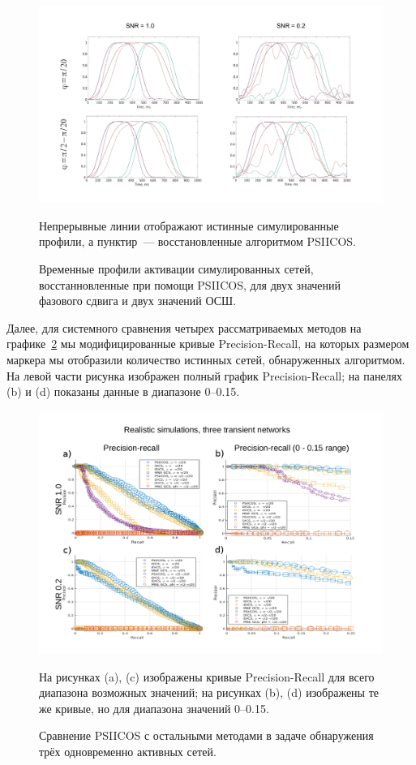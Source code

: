 \begin{figure}[!ht]
    \includegraphics[width=1\textwidth]{../images/psiicos_paper/Figure6_hr.jpg}
    \caption{Временные профили активации симулированных сетей, восстанновленные при помощи PSIICOS, для двух
        значений фазового сдвига и двух значений ОСШ.}\label{fig:06} %
        Непрерывные линии отображают истинные симулированные профили, а
        пунктир~--- восстановленные алгоритмом PSIICOS.\@
\end{figure}%

Далее, для системного сравнения четырех рассматриваемых методов на графике~\ref{fig:07}
мы модифицированные кривые Precision-Recall, на которых размером маркера мы отобразили
количество истинных сетей, обнаруженных алгоритмом. На левой части рисунка изображен
полный график Precision-Recall; на панелях (b) и (d) показаны данные в диапазоне 0--0.15.

\begin{figure}[!ht]
 \includegraphics[width=\textwidth]{../images/psiicos_paper/Figure7_hr.jpg}
 \caption{Сравнение PSIICOS с остальными методами в задаче обнаружения трёх
 одновременно активных сетей.}\label{fig:07} %
 На рисунках (a), (c) изображены кривые Precision-Recall для всего диапазона
 возможных значений; на рисунках (b), (d) изображены те же кривые, но для
 диапазона значений 0--0.15.
\end{figure}%

